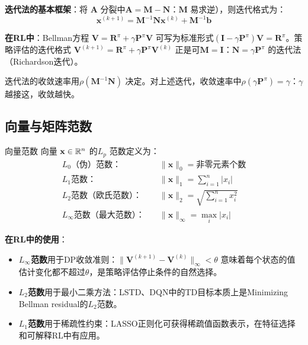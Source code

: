 \textbf{迭代法的基本框架}：将 $\mathbf{A}$ 分裂中$\mathbf{A} = \mathbf{M} - \mathbf{N}$：$\mathbf{M}$ 易求逆），则迭代格式为：
\[
\mathbf{x}^{(k+1)} = \mathbf{M}^{-1} \mathbf{N} \mathbf{x}^{(k)} + \mathbf{M}^{-1} \mathbf{b}
\]

\textbf{在RL中}：Bellman方程 $\mathbf{V} = \mathbf{R}^{\pi} + \gamma \mathbf{P}^{\pi} \mathbf{V}$ 可写为标准形式$(\mathbf{I} - \gamma \mathbf{P}^{\pi}) \mathbf{V} = \mathbf{R}^{\pi}$。策略评估的迭代格式 $\mathbf{V}^{(k+1)} = \mathbf{R}^{\pi} + \gamma \mathbf{P}^{\pi} \mathbf{V}^{(k)}$ 正是可$\mathbf{M} = \mathbf{I}$：$\mathbf{N} = \gamma \mathbf{P}^{\pi}$ 的迭代法（Richardson迭代）。

迭代法的收敛速率用$\rho(\mathbf{M}^{-1} \mathbf{N})$ 决定。对上述迭代，收敛速率中$\rho(\gamma \mathbf{P}^{\pi}) = \gamma$：$\gamma$ 越接这，收敛越快。

\subsection{向量与矩阵范数}

\begin{mydefinition}{向量范数}
向量 $\mathbf{x} \in \mathbb{R}^n$ 的$L_p$ 范数定义为：
\begin{align*}
L_0\text{（伪）范数：}&\quad \|\mathbf{x}\|_0 = \text{非零元素个数} \\
L_1\text{范数：}&\quad \|\mathbf{x}\|_1 = \sum_{i=1}^{n} |x_i| \\
L_2\text{范数（欧氏范数）：}&\quad \|\mathbf{x}\|_2 = \sqrt{\sum_{i=1}^{n} x_i^2} \\
L_\infty\text{范数（最大范数）：}&\quad \|\mathbf{x}\|_\infty = \max_{i} |x_i|
\end{align*}
\end{mydefinition}

\textbf{在RL中的使用}：
\begin{itemize}
    \item \textbf{$L_\infty$范数}用于DP收敛准则：$\|\mathbf{V}^{(k+1)} - \mathbf{V}^{(k)}\|_\infty < \theta$ 意味着每个状态的值估计变化都不超过$\theta$，是策略评估停止条件的自然选择。
    \item \textbf{$L_2$范数}用于最小二乘方法：LSTD、DQN中的TD目标本质上是Minimizing Bellman residual的$L_2$范数。
    \item \textbf{$L_1$范数}用于稀疏性约束：LASSO正则化可获得稀疏值函数表示，在特征选择和可解释RL中有应用。
\end{itemize}

